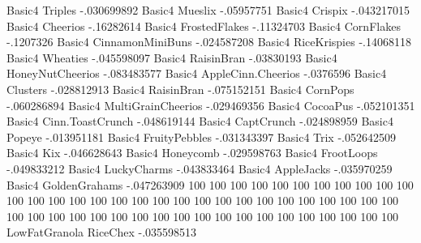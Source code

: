 Basic4	Triples	-.030699892
Basic4	Mueslix	-.05957751
Basic4	Crispix	-.043217015
Basic4	Cheerios	-.16282614
Basic4	FrostedFlakes	-.11324703
Basic4	CornFlakes	-.1207326
Basic4	CinnamonMiniBuns	-.024587208
Basic4	RiceKrispies	-.14068118
Basic4	Wheaties	-.045598097
Basic4	RaisinBran	-.03830193
Basic4	HoneyNutCheerios	-.083483577
Basic4	AppleCinn.Cheerios	-.0376596
Basic4	Clusters	-.028812913
Basic4	RaisinBran	-.075152151
Basic4	CornPops	-.060286894
Basic4	MultiGrainCheerios	-.029469356
Basic4	CocoaPus	-.052101351
Basic4	Cinn.ToastCrunch	-.048619144
Basic4	CaptCrunch	-.024898959
Basic4	Popeye	-.013951181
Basic4	FruityPebbles	-.031343397
Basic4	Trix	-.052642509
Basic4	Kix	-.046628643
Basic4	Honeycomb	-.029598763
Basic4	FrootLoops	-.049833212
Basic4	LuckyCharms	-.043833464
Basic4	AppleJacks	-.035970259
Basic4	GoldenGrahams	-.047263909
100%
100%
100%
100%
100%
100%
100%
100%
100%
100%
100%
100%
100%
100%
100%
100%
100%
100%
100%
100%
100%
100%
100%
100%
100%
100%
100%
100%
100%
100%
100%
100%
100%
100%
100%
100%
100%
100%
100%
100%
100%
100%
100%
100%
100%
100%
100%
100%
100%
LowFatGranola	RiceChex	-.035598513
